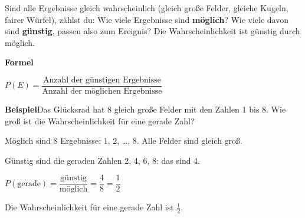 \documentclass[11pt]{article}
\begin{document}
\clearpage\label{s:A}\noindent\colorbox{black!12}{}\hspace{3mm}{\Large\bfseries Günstig durch möglich}\par\smallskip
\noindent Sind alle Ergebnisse gleich wahrscheinlich (gleich große Felder, gleiche Kugeln, fairer Würfel), zählst du: Wie viele Ergebnisse sind \textbf{möglich}? Wie viele davon sind \textbf{günstig}, passen also zum Ereignis? Die Wahrscheinlichkeit ist günstig durch möglich.\par\medskip
\noindent\textbf{Formel}\par\nopagebreak\noindent\hspace*{4mm}\begin{minipage}{\dimexpr\linewidth-4mm\relax}$P(E) = \dfrac{\text{Anzahl der günstigen Ergebnisse}}{\text{Anzahl der möglichen Ergebnisse}}$ \end{minipage}\par\medskip
\noindent\textbf{Beispiel}\quad Das Glücksrad hat 8 gleich große Felder mit den Zahlen 1 bis 8. Wie groß ist die Wahrscheinlichkeit für eine gerade Zahl?\par\smallskip
\noindent\begin{minipage}[t]{0.6\linewidth}\vspace{0pt}\par\noindent{}Möglich sind 8 Ergebnisse: 1, 2, \ldots, 8. Alle Felder sind gleich groß.\par\smallskip\par\noindent{}Günstig sind die geraden Zahlen 2, 4, 6, 8: das sind 4.\par\smallskip\par\noindent{}$P(\text{gerade}) = \dfrac{\text{günstig}}{\text{möglich}} = \dfrac{4}{8} = \dfrac{1}{2}$\par\smallskip\par\noindent{}Die Wahrscheinlichkeit für eine gerade Zahl ist $\frac{1}{2}$.\par\smallskip\end{minipage}\hfill
\end{document}
